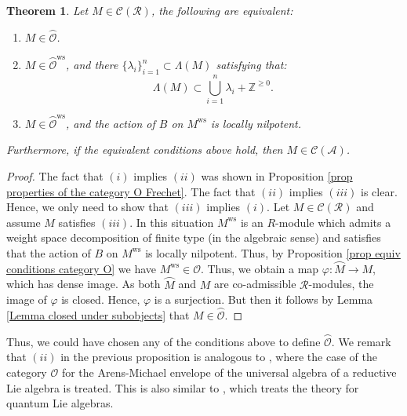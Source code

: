 \documentclass{amsart}
\newtheorem{teo}[defi]{ Theorem}
\newcommand{\OX}{\mathcal{O}}
\begin{document}
\begin{teo}
Let $M\in \mathcal{C}(\mathscr{R})$, the following are equivalent:
\begin{enumerate}[label=(\roman*)]
    \item $M\in \wideparen{\OX}$.
    \item $M\in \wideparen{\OX}^{\operatorname{ws}}$, and there $\{\lambda_i\}_{i=1}^n\subset \Lambda(M)$  satisfying that:
    \begin{equation*}
        \Lambda(M)\subset \bigcup_{i=1}^n\lambda_i+\mathbb{Z}^{\geq 0}.
    \end{equation*}
    \item $M\in \wideparen{\OX}^{\operatorname{ws}}$, and the action of $B$ on $M^{\operatorname{ws}}$ is locally nilpotent.
\end{enumerate}
Furthermore, if the equivalent conditions above hold, then $M\in\mathcal{C}(\mathscr{A})$.
\end{teo}
\begin{proof}
The fact that $(i)$ implies $(ii)$ was shown in Proposition \ref{prop properties of the category O Frechet}.  The fact that $(ii)$ implies $(iii)$ is clear. Hence, we only need to show that $(iii)$ implies $(i)$. Let $M\in \mathcal{C}(\mathscr{R})$ and assume $M$ satisfies $(iii)$. In this situation $M^{\operatorname{ws}}$ is an $R$-module which admits a weight space decomposition of finite type (in the algebraic sense) and satisfies that the action of $B$ on $M^{\operatorname{ws}}$ is locally nilpotent. Thus, by Proposition \ref{prop equiv conditions category O} we have  $M^{\operatorname{ws}}\in \OX$. Thus, we obtain a map $\varphi:\wideparen{M}\rightarrow M$, which has dense image. As both $\wideparen{M}$ and $M$ are co-admissible $\mathscr{R}$-modules, the image of $\varphi$ is closed. Hence, $\varphi$ is a surjection. But then it follows by Lemma \ref{Lemma closed under subobjects} that $M\in \wideparen{\OX}$.
\end{proof}
Thus, we could have chosen any of the conditions above to define $\wideparen{\OX}$. We remark that $(ii)$ in the previous proposition is analogous to \cite[Definition 3.6.2.]{Schmidt2010VermaMO}, where the case of the category $\OX$ for the Arens-Michael envelope of the universal algebra of a reductive Lie algebra is treated. This is also similar to \cite{Duprequantum}, which treats the theory for quantum Lie algebras.\bigskip
\end{document}
